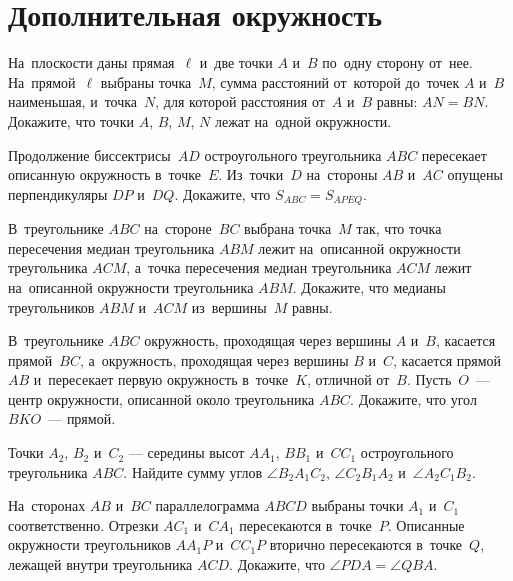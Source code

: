 
\section*{Дополнительная окружность}



\begin{problems}

\item
На~плоскости даны прямая~$\ell$ и~две точки $A$ и~$B$ по~одну сторону от~нее.
На~прямой~$\ell$ выбраны точка~$M$, сумма расстояний от~которой
до~точек $A$ и~$B$ наименьшая, и~точка~$N$, для которой расстояния
от~$A$ и~$B$ равны: $AN = BN$.
Докажите, что точки $A$, $B$, $M$, $N$ лежат на~одной окружности.

\item
Продолжение биссектрисы~$AD$ остроугольного треугольника $ABC$ пересекает
описанную окружность в~точке~$E$.
Из~точки~$D$ на~стороны $AB$ и~$AC$ опущены перпендикуляры $DP$ и~$DQ$.
Докажите, что $S_{ABC}= S_{APEQ}$.

\item
В~треугольнике $ABC$ на~стороне~$BC$ выбрана точка~$M$ так, что точка
пересечения медиан треугольника $ABM$ лежит на~описанной окружности
треугольника $ACM$, а~точка пересечения медиан треугольника $ACM$ лежит
на~описанной окружности треугольника $ABM$.
Докажите, что медианы треугольников $ABM$ и~$ACM$ из~вершины~$M$ равны.

\item
В~треугольнике $ABC$ окружность, проходящая через вершины $A$ и~$B$, касается
прямой~$BC$, а~окружность, проходящая через вершины $B$ и~$C$, касается
прямой~$AB$ и~пересекает первую окружность в~точке~$K$, отличной от~$B$.
Пусть~$O$~--- центр окружности, описанной около треугольника $ABC$.
Докажите, что угол $BKO$~--- прямой.

\item
Точки $A_2$, $B_2$ и~$C_2$ --– середины высот $A A_1$, $B B_1$ и~$C C_1$
остроугольного треугольника $ABC$.
Найдите сумму углов
$\angle B_2 A_1 C_2$, $\angle C_2 B_1 A_2$ и~$\angle A_2 C_1 B_2$.

\item
На~сторонах $AB$ и~$BC$ параллелограмма $ABCD$ выбраны точки $A_1$ и~$C_1$
соответственно.
Отрезки $A C_1$ и~$C A_1$ пересекаются в~точке~$P$.
Описанные окружности треугольников $A A_1 P$ и~$C C_1 P$ вторично пересекаются
в~точке~$Q$, лежащей внутри треугольника $ACD$.
Докажите, что $\angle PDA = \angle QBA$.


\end{problems}
